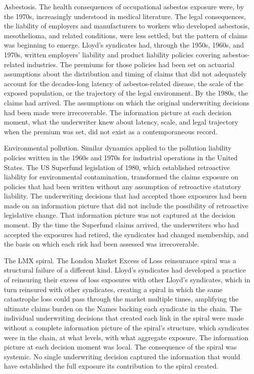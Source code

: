 Asbestosis. The health consequences of occupational asbestos exposure were, by the 1970s, increasingly understood in medical literature. The legal consequences, the liability of employers and manufacturers to workers who developed asbestosis, mesothelioma, and related conditions, were less settled, but the pattern of claims was beginning to emerge. Lloyd's syndicates had, through the 1950s, 1960s, and 1970s, written employers' liability and product liability policies covering asbestos-related industries. The premiums for those policies had been set on actuarial assumptions about the distribution and timing of claims that did not adequately account for the decades-long latency of asbestos-related disease, the scale of the exposed population, or the trajectory of the legal environment. By the 1980s, the claims had arrived. The assumptions on which the original underwriting decisions had been made were irrecoverable. The information picture at each decision moment, what the underwriter knew about latency, scale, and legal trajectory when the premium was set, did not exist as a contemporaneous record.

Environmental pollution. Similar dynamics applied to the pollution liability policies written in the 1960s and 1970s for industrial operations in the United States. The US Superfund legislation of 1980, which established retroactive liability for environmental contamination, transformed the claims exposure on policies that had been written without any assumption of retroactive statutory liability. The underwriting decisions that had accepted those exposures had been made on an information picture that did not include the possibility of retroactive legislative change. That information picture was not captured at the decision moment. By the time the Superfund claims arrived, the underwriters who had accepted the exposures had retired, the syndicates had changed membership, and the basis on which each risk had been assessed was irrecoverable.

The LMX spiral. The London Market Excess of Loss reinsurance spiral was a structural failure of a different kind. Lloyd's syndicates had developed a practice of reinsuring their excess of loss exposures with other Lloyd's syndicates, which in turn reinsured with other syndicates, creating a spiral in which the same catastrophe loss could pass through the market multiple times, amplifying the ultimate claims burden on the Names backing each syndicate in the chain. The individual underwriting decisions that created each link in the spiral were made without a complete information picture of the spiral's structure, which syndicates were in the chain, at what levels, with what aggregate exposure. The information picture at each decision moment was local. The consequence of the spiral was systemic. No single underwriting decision captured the information that would have established the full exposure its contribution to the spiral created.

